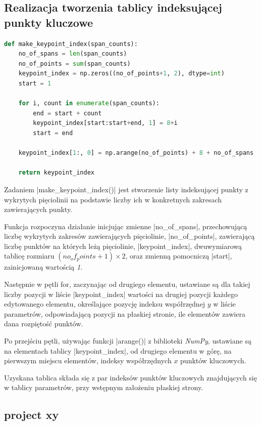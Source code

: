 \subsection{Realizacja tworzenia tablicy indeksującej punkty kluczowe}
\begin{lstlisting}[caption={\pyth|make_keypoint_index()| - funkcja tworząca indeksy punktów kluczowych}, label={make-keypoint-index}, language=Python]
def make_keypoint_index(span_counts):	
	no_of_spans = len(span_counts)
	no_of_points = sum(span_counts)
	keypoint_index = np.zeros((no_of_points+1, 2), dtype=int)
	start = 1
	
	for i, count in enumerate(span_counts):
		end = start + count
		keypoint_index[start:start+end, 1] = 8+i
		start = end
	
	keypoint_index[1:, 0] = np.arange(no_of_points) + 8 + no_of_spans
	
	return keypoint_index
\end{lstlisting}

Zadaniem \pyth|make_keypoint_index()| jest stworzenie listy indeksującej punkty z wykrytych pięciolinii na podstawie liczby ich w konkretnych zakresach zawierających punkty.

Funkcja rozpoczyna działanie inicjując zmienne \pyth|no_of_spans|, przechowującą liczbę wykrytych zakresów zawierających pięciolinie, \pyth|no_of_points|, zawierającą liczbę punktów na których leżą pięciolinie, \pyth|keypoint_index|, dwuwymiarową tablicę rozmiaru $(no_of_points + 1) \times 2$, oraz zmienną pomocniczą \pyth|start|, zainicjowaną wartością \textit{1}.

Następnie w pętli for, zaczynając od drugiego elementu, ustawiane są dla takiej liczby pozycji w liście \pyth|keypoint_index| wartości na drugiej pozycji każdego edytowanego elementu, określające pozycję indeksu współrzędnej $y$ w liście parametrów, odpowiadającą pozycji na płaskiej stronie, ile elementów zawiera dana rozpiętość punktów.

Po przejściu pętli, używając funkcji \pyth|arange()| z biblioteki \textit{NumPy}, ustawiane są na elementach tablicy \pyth|keypoint_index|, od drugiego elementu w górę, na pierwszym miejscu elementów, indeksy współrzędnych $x$ punktów kluczowych.

Uzyskana tablica składa się z par indeksów punktów kluczowych znajdujących się w tablicy parametrów, przy wstępnym założeniu płaskiej strony.


\subsection{project xy}

